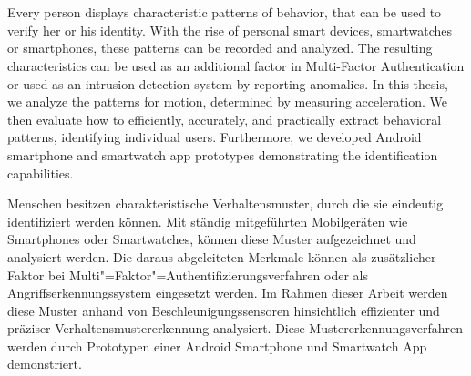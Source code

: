 \chapter{\abstractname}
Every person displays characteristic patterns of behavior, that can be used to verify her or his identity. With the rise of personal smart devices, \eg smartwatches or smartphones, these patterns can be recorded and analyzed. The resulting characteristics can be used as an additional factor in Multi-Factor Authentication or used as an intrusion detection system by reporting anomalies.
In this thesis, we analyze the patterns for motion, determined by measuring acceleration. We then evaluate how to efficiently, accurately, and practically extract behavioral patterns, identifying individual users. Furthermore, we developed Android smartphone and smartwatch app prototypes demonstrating the identification capabilities.

\vspace{3cm}
\noindent
Menschen besitzen charakteristische Verhaltensmuster, durch die sie eindeutig identifiziert werden können. Mit ständig mitgeführten Mobilgeräten wie Smartphones oder Smartwatches, können diese Muster aufgezeichnet und analysiert werden. Die daraus abgeleiteten Merkmale können als zusätzlicher Faktor bei Multi"=Faktor"=Authentifizierungsverfahren oder als Angriffserkennungssystem eingesetzt werden.
Im Rahmen dieser Arbeit werden diese Muster anhand von Beschleunigungssensoren hinsichtlich effizienter und präziser Verhaltensmustererkennung analysiert. Diese Mustererkennungsverfahren werden durch Prototypen einer Android Smartphone und Smartwatch App demonstriert.
\frenchspacing
